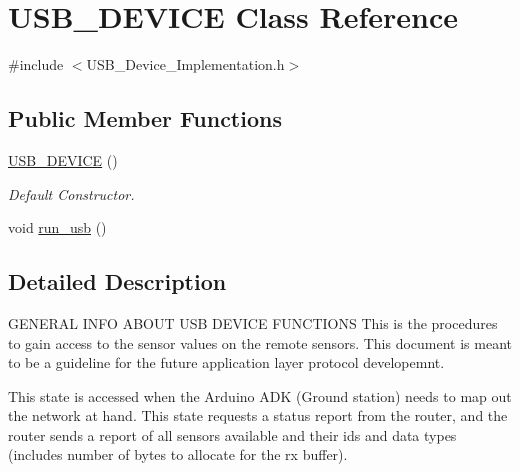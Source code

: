 \hypertarget{class_u_s_b___d_e_v_i_c_e}{\section{U\-S\-B\-\_\-\-D\-E\-V\-I\-C\-E Class Reference}
\label{class_u_s_b___d_e_v_i_c_e}
}


{\ttfamily \#include $<$U\-S\-B\-\_\-\-Device\-\_\-\-Implementation.\-h$>$}

\subsection*{Public Member Functions}
\begin{DoxyCompactItemize}
\item 
\hyperlink{class_u_s_b___d_e_v_i_c_e_a8237f16f402e2d922ab4502849362b4b}{U\-S\-B\-\_\-\-D\-E\-V\-I\-C\-E} ()
\begin{DoxyCompactList}\small\item\em Default Constructor. \end{DoxyCompactList}\item 
void \hyperlink{class_u_s_b___d_e_v_i_c_e_a98fbf9b9aae2f3cc64c0007933326e25}{run\-\_\-usb} ()
\end{DoxyCompactItemize}


\subsection{Detailed Description}
G\-E\-N\-E\-R\-A\-L I\-N\-F\-O A\-B\-O\-U\-T U\-S\-B D\-E\-V\-I\-C\-E F\-U\-N\-C\-T\-I\-O\-N\-S This is the procedures to gain access to the sensor values on the remote sensors. This document is meant to be a guideline for the future application layer protocol developemnt.

This state is accessed when the Arduino A\-D\-K (Ground station) needs to map out the network at hand. This state requests a status report from the router, and the router sends a report of all sensors available and their ids and data types (includes number of bytes to allocate for the rx buffer).

